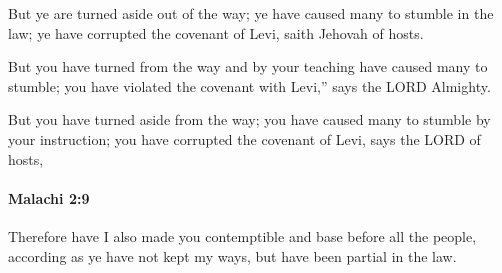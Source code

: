 			\begin{versebox}
					\item[BHS] 
					\item[LXX] 
					\item[ASV] But ye are turned aside out of the way; ye have caused many to stumble in the law; ye have corrupted the covenant of Levi, saith Jehovah of hosts.
					\item[NIV] But you have turned from the way and by your teaching have caused many to stumble; you have violated the covenant with Levi,” says the LORD Almighty.
					\item[NRSV] But you have turned aside from the way; you have caused many to stumble by your instruction; you have corrupted the covenant of Levi, says the LORD of hosts,
			\end{versebox}

		\paragraph{Malachi 2:9} %
			\label{MALACHI-2-9}

			Therefore have I also made you contemptible and base before all the people, according as ye have not kept my ways, but have been partial in the law.

